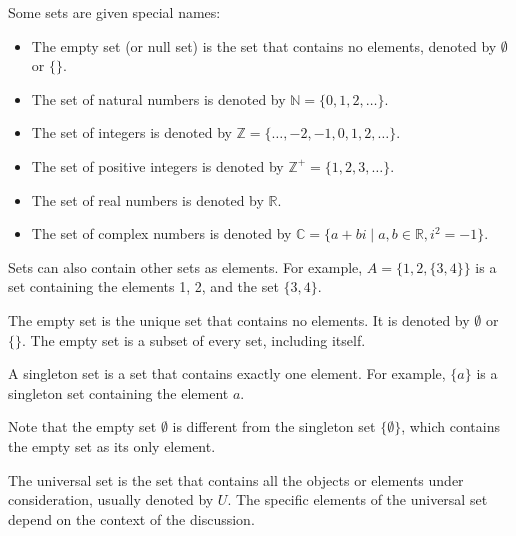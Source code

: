 \begin{eg}
    Some sets are given special names:
    \begin{itemize}[itemsep=1pt,label=$\circ$]
        \item The empty set (or null set) is the set that contains no elements, denoted by $\emptyset$ or $\{\}$.
        \item The set of natural numbers is denoted by $\mathbb{N} = \{0, 1, 2, \ldots\}$.
        \item The set of integers is denoted by $\mathbb{Z} = \{\ldots, -2, -1, 0, 1, 2, \ldots\}$.
        \item The set of positive integers is denoted by $\mathbb{Z}^+ = \{1, 2, 3, \ldots\}$.
        \item The set of real numbers is denoted by $\mathbb{R}$.
        \item The set of complex numbers is denoted by $\mathbb{C} = \{a + bi \mid a, b \in \mathbb{R}, i^2 = -1\}$.
    \end{itemize}
\end{eg}
Sets can also contain other sets as elements. For example, $A = \{1, 2, \{3, 4\}\}$ is a set containing the elements 1, 2, and the set $\{3, 4\}$.

\begin{definition}
    The empty set is the unique set that contains no elements. It is denoted by $\emptyset$ or $\{\}$. The empty set is a subset of every set, including itself.
\end{definition}

\begin{definition}
    A singleton set is a set that contains exactly one element. For example, $\{a\}$ is a singleton set containing the element $a$.
\end{definition}
Note that the empty set $\emptyset$ is different from the singleton set $\{\emptyset\}$, which contains the empty set as its only element.

\begin{definition}
    The universal set is the set that contains all the objects or elements under consideration, usually denoted by $U$. The specific elements of the universal set depend on the context of the discussion.
\end{definition}

